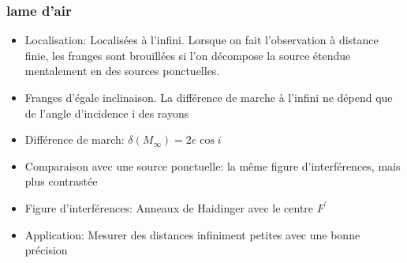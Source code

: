 \documentclass[a4paper,12pt]{book}
\begin{document}
\subsubsection{lame d'air}
\begin{itemize}
    \item Localisation: Localisées à l'infini. Lorsque on fait l'observation à distance finie, les franges sont brouillées si l'on décompose la source étendue mentalement 
    en des sources ponctuelles.
    \item Franges d'égale inclinaison. La différence de marche à l'infini ne dépend 
          que de l'angle d'incidence i des rayons
    \item Différence de march: $\delta(M_{\infty})=2e\cos{i}$
    \item Comparaison avec une source ponctuelle: la même figure d'interférences, mais plus contrastée
    \item Figure d'interférences: Anneaux de Haidinger avec le centre $F^{'}$
    \item Application: Mesurer des distances infiniment petites avec une bonne précision
\end{itemize}
\end{document}
